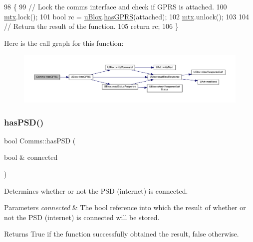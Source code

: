 \begin{DoxyCode}
98 \{
99     \textcolor{comment}{// Lock the comms interface and check if GPRS is attached.}
100     \hyperlink{class_comms_a21df861b1202573e4cd0cb5666d638fe}{mtx}.lock();
101     \textcolor{keywordtype}{bool} rc = \hyperlink{class_comms_ac64dea134b116147e5441172346dbd6c}{uBlox}.\hyperlink{class_u_blox_a4f5a31b4ddda664b255ce3f63e9ffac7}{hasGPRS}(attached);
102     \hyperlink{class_comms_a21df861b1202573e4cd0cb5666d638fe}{mtx}.unlock();
103 
104     \textcolor{comment}{// Return the result of the function.}
105     \textcolor{keywordflow}{return} rc;
106 \}
\end{DoxyCode}
Here is the call graph for this function\+:
\nopagebreak
\begin{figure}[H]
\begin{center}
\leavevmode
\includegraphics[width=350pt]{d8/dcc/class_comms_a583e3d933cca0c1eca9ec77e66bd6b84_cgraph}
\end{center}
\end{figure}
\mbox{\label{class_comms_a2c43ce409b48f4d28eefb7934cdd1523}} 
\subsubsection{\texorpdfstring{has\+P\+S\+D()}{hasPSD()}}
{\footnotesize\ttfamily bool Comms\+::has\+P\+SD (\begin{DoxyParamCaption}\item[{bool \&}]{connected }\end{DoxyParamCaption})}

Determines whether or not the P\+SD (internet) is connected.


\begin{DoxyParams}{Parameters}
{\em connected} & The bool reference into which the result of whether or not the P\+SD (internet) is connected will be stored. \\
\hline
\end{DoxyParams}
\begin{DoxyReturn}{Returns}
True if the function successfully obtained the result, false otherwise. 
\end{DoxyReturn}


